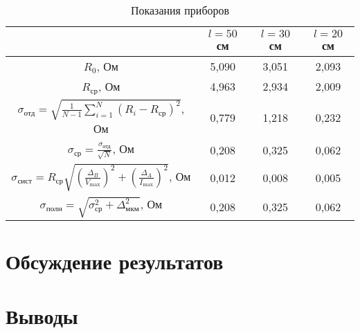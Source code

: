 \documentclass[a4paper]{article}
\begin{document}
\begin{table}[h]
\caption{Показания приборов}
\centering
\begin{tabular}{|c|c|c|c|}
\hline
& $l = 50$ см &  $l = 30$ см &   $l = 20$ см  \\
\hline
$R_0$, Ом  & 5,090 & 3,051 & 2,093 \\
\hline
$R_\text{ср}$, Ом & 4,963 & 2,934 & 2,009 \\
\hline
$\sigma_\text{отд} = \sqrt{\frac{1}{N-1} \sum_{i=1}^{N} (R_i - R_\text{ср})^2} $, Ом  & 0,779  & 1,218 & 0,232 \\
\hline
$\sigma_\text{ср} = \frac{\sigma_\text{отд}}{\sqrt{N}} $, Ом  & 0,208  & 0,325 & 0,062 \\
\hline
$\sigma_\text{сист} = R_\text{ср} \sqrt{\left(\frac{\Delta_B}{V_{\text{max}}}\right)^2 + \left(\frac{\Delta_A}{I_{\text{max}}}\right)^2} $, Ом  & 0,012  & 0,008 & 0,005 \\
\hline
$\sigma_\text{полн} = \sqrt{\sigma_\text{ср}^2 + \Delta_\text{мкм}^2}$, Ом  & 0,208  & 0,325 & 0,062 \\
\hline
\end{tabular}
\end{table}



\section{Обсуждение результатов}

\section{Выводы}
\end{document}
